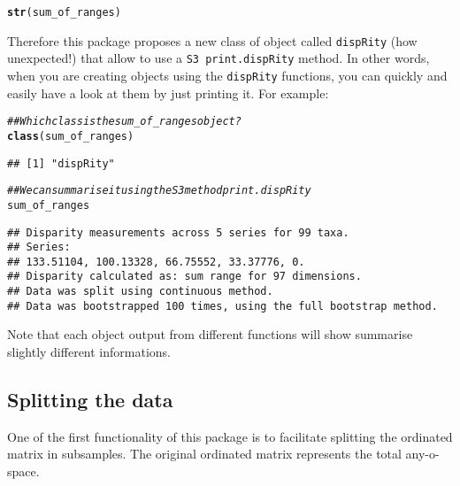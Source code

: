 \documentclass{article}\usepackage[]{graphicx}\usepackage[]{color}
\makeatletter
\newcommand{\hlcom}[1]{\textcolor[rgb]{0.678,0.584,0.686}{\textit{#1}}}%
\newcommand{\hlstd}[1]{\textcolor[rgb]{0.345,0.345,0.345}{#1}}%
\newcommand{\hlkwd}[1]{\textcolor[rgb]{0.737,0.353,0.396}{\textbf{#1}}}%
\newenvironment{kframe}{%
 \def\at@end@of@kframe{}%
 \ifinner\ifhmode%
  \def\at@end@of@kframe{\end{minipage}}%
  \begin{minipage}{\columnwidth}%
 \fi\fi%
 \def\FrameCommand##1{\hskip\@totalleftmargin \hskip-\fboxsep
 \colorbox{shadecolor}{##1}\hskip-\fboxsep
     \hskip-\linewidth \hskip-\@totalleftmargin \hskip\columnwidth}%
 \MakeFramed {\advance\hsize-\width
   \@totalleftmargin\z@ \linewidth\hsize
   \@setminipage}}%
 {\par\unskip\endMakeFramed%
 \at@end@of@kframe}
\newenvironment{knitrout}{}{} %
\newcommand{\dispRity}{\texttt{dispRity} }
\makeatother
\begin{document}
\begin{knitrout}
\color{fgcolor}\begin{kframe}
\begin{alltt}
\hlkwd{str}\hlstd{(sum_of_ranges)}
\end{alltt}
\end{kframe}
\end{knitrout}

Therefore this package proposes a new class of object called \dispRity (how unexpected!) that allow to use a \texttt{S3 print.dispRity} method.
In other words, when you are creating objects using the \dispRity functions, you can quickly and easily have a look at them by just printing it.
For example:

\begin{knitrout}
\color{fgcolor}\begin{kframe}
\begin{alltt}
\hlcom{## Which class is the sum_of_ranges object?}
\hlkwd{class}\hlstd{(sum_of_ranges)}
\end{alltt}
\begin{verbatim}
## [1] "dispRity"
\end{verbatim}
\begin{alltt}
\hlcom{## We can summarise it using the S3 method print.dispRity}
\hlstd{sum_of_ranges}
\end{alltt}
\begin{verbatim}
## Disparity measurements across 5 series for 99 taxa. 
## Series:
## 133.51104, 100.13328, 66.75552, 33.37776, 0.
## Disparity calculated as: sum range for 97 dimensions.
## Data was split using continuous method.
## Data was bootstrapped 100 times, using the full bootstrap method.
\end{verbatim}
\end{kframe}
\end{knitrout}

Note that each object output from different functions will show summarise slightly different informations.

\subsection{Splitting the data}
One of the first functionality of this package is to facilitate splitting the ordinated matrix in subsamples.
The original ordinated matrix represents the total any-o-space.
\end{document}
